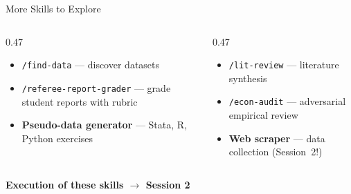 \documentclass[aspectratio=169, 10pt]{beamer}
\begin{document}
\begin{frame}{More Skills to Explore}
\begin{columns}[T]
\begin{column}{0.47\textwidth}
\begin{tcolorbox}[keybox, title={\faChalkboard\quad Teaching Skills}]
\scriptsize
\begin{itemize}\setlength{\itemsep}{1pt}
  \item \texttt{/find-data} --- discover datasets
  \item \texttt{/referee-report-grader} --- grade student reports with rubric
  \item \textbf{Pseudo-data generator} --- Stata, R, Python exercises
\end{itemize}
\end{tcolorbox}
\end{column}
\begin{column}{0.47\textwidth}
\begin{tcolorbox}[keybox, title={\faSearch\quad Research Skills}]
\scriptsize
\begin{itemize}\setlength{\itemsep}{1pt}
  \item \texttt{/lit-review} --- literature synthesis
  \item \texttt{/econ-audit} --- adversarial empirical review
  \item \textbf{Web scraper} --- data collection (Session~2!)
\end{itemize}
\end{tcolorbox}
\end{column}
\end{columns}
\vskip8pt
\begin{tcolorbox}[accentbox, halign=center, width=8cm, top=3pt, bottom=3pt]
\small\bfseries Execution of these skills $\rightarrow$ Session 2
\end{tcolorbox}
\end{frame}
\end{document}

